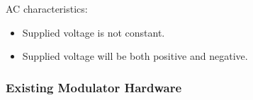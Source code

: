 \documentclass{beamer}
\begin{document}
\begin{frame}
\begin{figure}
{		  }
		\end{figure}

		AC characteristics:

		\begin{itemize}

			\item Supplied voltage is not constant.

			\item Supplied voltage will be both positive and negative.

		\end{itemize}
		
	\end{frame}






	\begin{frame}\frametitle{Existing Modulator Hardware}


\end{frame}
\end{document}
